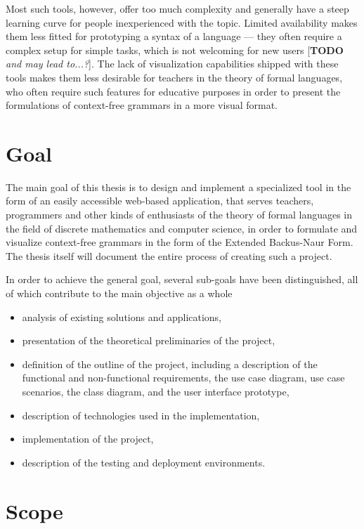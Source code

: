 \documentclass[english,engineering]{wizthesis}
\newcommand{\todo}[1]{{\color{red}[\textbf{TODO} \textit{#1}]}}
\begin{document}
Most such tools, however, offer too much complexity and generally have a steep
learning curve for people inexperienced with the topic. Limited availability
makes them less fitted for prototyping a syntax of a language --- they often
require a complex setup for simple tasks, which is not welcoming for new users
\todo{and may lead to...?}. The lack of visualization capabilities shipped with
these tools makes them less desirable for teachers in the theory of formal
languages, who often require such features for educative purposes in order to
present the formulations of context-free grammars in a more visual format.

\section{Goal}

The main goal of this thesis is to design and implement a specialized tool in
the form of an easily accessible web-based application, that serves teachers,
programmers and other kinds of enthusiasts of the theory of formal languages in
the field of discrete mathematics and computer science, in order to formulate
and visualize context-free grammars in the form of the Extended Backus-Naur
Form. The thesis itself will document the entire process of creating such a
project.

In order to achieve the general goal, several sub-goals have been
distinguished, all of which contribute to the main objective as a whole
\begin{itemize}
  \item analysis of existing solutions and applications,
  \item presentation of the theoretical preliminaries of the project,
  \item definition of the outline of the project, including a description of
  the functional and non-functional requirements, the use case diagram, use case
  scenarios, the class diagram, and the user interface prototype,
  \item description of technologies used in the implementation,
  \item implementation of the project,
  \item description of the testing and deployment environments.
\end{itemize}

\section{Scope}
\end{document}
